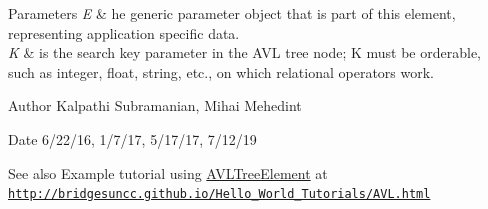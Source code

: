 \begin{DoxyParams}{Parameters}
{\em E} & he generic parameter object that is part of this element, representing application specific data. \\
\hline
{\em K} & is the search key parameter in the A\+VL tree node; K must be orderable, such as integer, float, string, etc., on which relational operators work.\\
\hline
\end{DoxyParams}
\begin{DoxyAuthor}{Author}
Kalpathi Subramanian, Mihai Mehedint
\end{DoxyAuthor}
\begin{DoxyDate}{Date}
6/22/16, 1/7/17, 5/17/17, 7/12/19
\end{DoxyDate}
\begin{DoxySeeAlso}{See also}
Example tutorial using \hyperlink{classbridges_1_1base_1_1_a_v_l_tree_element}{A\+V\+L\+Tree\+Element} at ~\newline
 \href{http://bridgesuncc.github.io/Hello_World_Tutorials/AVL.html}{\tt http\+://bridgesuncc.\+github.\+io/\+Hello\+\_\+\+World\+\_\+\+Tutorials/\+A\+V\+L.\+html} 
\end{DoxySeeAlso}
